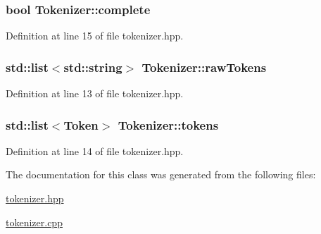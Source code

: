 \subsubsection[{complete}]{\setlength{\rightskip}{0pt plus 5cm}bool Tokenizer\+::complete}\label{class_tokenizer_a330a4cce0cbf3ebfbe601d97022d1ed4}


Definition at line 15 of file tokenizer.\+hpp.

\hypertarget{class_tokenizer_a89707ad3a758fc9ec58f00d92d5fc622}{}
\subsubsection[{raw\+Tokens}]{\setlength{\rightskip}{0pt plus 5cm}std\+::list$<$std\+::string$>$ Tokenizer\+::raw\+Tokens}\label{class_tokenizer_a89707ad3a758fc9ec58f00d92d5fc622}


Definition at line 13 of file tokenizer.\+hpp.

\hypertarget{class_tokenizer_ae547093dbd03b3e70373147e4669d9fa}{}
\subsubsection[{tokens}]{\setlength{\rightskip}{0pt plus 5cm}std\+::list$<${\bf Token}$>$ Tokenizer\+::tokens}\label{class_tokenizer_ae547093dbd03b3e70373147e4669d9fa}


Definition at line 14 of file tokenizer.\+hpp.



The documentation for this class was generated from the following files\+:\begin{DoxyCompactItemize}
\item 
\hyperlink{tokenizer_8hpp}{tokenizer.\+hpp}\item 
\hyperlink{tokenizer_8cpp}{tokenizer.\+cpp}\end{DoxyCompactItemize}
